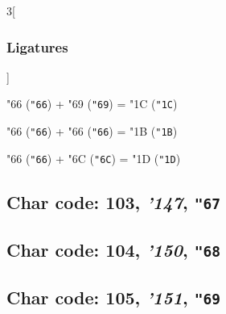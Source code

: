 \documentclass{article}
\newlength{\maxcharwidth}
\begin{document}
\begin{multicols}{3}[\subsubsection{Ligatures}]

{\testfont\char"66\noboundary} ({\tt"66}) + {\testfont\char"69\noboundary} ({\tt"69}) = {\testfont\char"1C\noboundary} ({\tt"1C}) 

{\testfont\char"66\noboundary} ({\tt"66}) + {\testfont\char"66\noboundary} ({\tt"66}) = {\testfont\char"1B\noboundary} ({\tt"1B}) 

{\testfont\char"66\noboundary} ({\tt"66}) + {\testfont\char"6C\noboundary} ({\tt"6C}) = {\testfont\char"1D\noboundary} ({\tt"1D}) 

\end{multicols}

\subsection{Char code: 103, {\it'147}, {\tt"67}}
\label{char_103}


\subsection{Char code: 104, {\it'150}, {\tt"68}}
\label{char_104}


\subsection{Char code: 105, {\it'151}, {\tt"69}}
\label{char_105}

\end{document}
